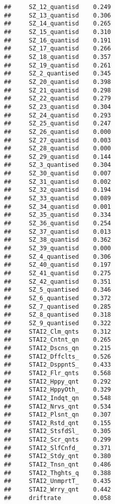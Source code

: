 \documentclass[]{article}
\begin{document}
\begin{verbatim}
##     SZ_12_quantisd    0.249
##     SZ_13_quantisd    0.306
##     SZ_14_quantisd    0.265
##     SZ_15_quantisd    0.310
##     SZ_16_quantisd    0.191
##     SZ_17_quantisd    0.266
##     SZ_18_quantisd    0.357
##     SZ_19_quantisd    0.261
##     SZ_2_quantised    0.345
##     SZ_20_quantisd    0.398
##     SZ_21_quantisd    0.298
##     SZ_22_quantisd    0.279
##     SZ_23_quantisd    0.304
##     SZ_24_quantisd    0.293
##     SZ_25_quantisd    0.247
##     SZ_26_quantisd    0.000
##     SZ_27_quantisd    0.003
##     SZ_28_quantisd    0.000
##     SZ_29_quantisd    0.144
##     SZ_3_quantised    0.304
##     SZ_30_quantisd    0.007
##     SZ_31_quantisd    0.002
##     SZ_32_quantisd    0.194
##     SZ_33_quantisd    0.089
##     SZ_34_quantisd    0.001
##     SZ_35_quantisd    0.334
##     SZ_36_quantisd    0.254
##     SZ_37_quantisd    0.013
##     SZ_38_quantisd    0.362
##     SZ_39_quantisd    0.000
##     SZ_4_quantised    0.306
##     SZ_40_quantisd    0.197
##     SZ_41_quantisd    0.275
##     SZ_42_quantisd    0.351
##     SZ_5_quantised    0.346
##     SZ_6_quantised    0.372
##     SZ_7_quantised    0.285
##     SZ_8_quantised    0.318
##     SZ_9_quantised    0.322
##     STAI2_Clm_qnts    0.312
##     STAI2_Cntnt_qn    0.265
##     STAI2_Dscns_qn    0.215
##     STAI2_Dffclts_    0.526
##     STAI2_DsppntS_    0.433
##     STAI2_Flr_qnts    0.568
##     STAI2_Hppy_qnt    0.292
##     STAI2_HppyOth_    0.329
##     STAI2_Indqt_qn    0.548
##     STAI2_Nrvs_qnt    0.534
##     STAI2_Plsnt_qn    0.307
##     STAI2_Rstd_qnt    0.155
##     STAI2_StsfdSl_    0.305
##     STAI2_Scr_qnts    0.299
##     STAI2_SlfCnfd_    0.371
##     STAI2_Stdy_qnt    0.380
##     STAI2_Tnsn_qnt    0.486
##     STAI2_Thghts_q    0.388
##     STAI2_UnmprtT_    0.435
##     STAI2_Wrry_qnt    0.442
##     driftrate         0.058
\end{verbatim}
\end{document}
